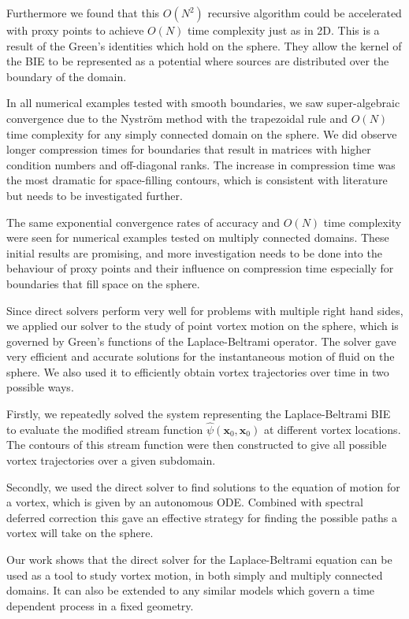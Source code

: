 \documentclass{sfuthesis}
\begin{document}
Furthermore we found that this $O(N^2)$ recursive algorithm could be accelerated with proxy points to achieve $O(N)$ time complexity just as in 2D. This is a result of the Green's identities which hold on the sphere. They allow the kernel of the BIE to be represented as a potential where sources are distributed over the boundary of the domain. 

In all numerical examples tested with smooth boundaries, we saw super-algebraic convergence due to the Nystr\"{o}m method with the trapezoidal rule and $O(N)$ time complexity for any simply connected domain on the sphere. We did observe longer compression times for boundaries that result in matrices with higher condition numbers and off-diagonal ranks. The increase in compression time was the most dramatic for space-filling contours, which is consistent with literature but needs to be investigated further. 

The same exponential convergence rates of accuracy and $O(N)$ time complexity were seen for numerical examples tested on multiply connected domains. These initial results are promising, and more investigation needs to be done into the behaviour of proxy points and their influence on compression time especially for boundaries that fill space on the sphere. 

Since direct solvers perform very well for problems with multiple right hand sides, we applied our solver to the study of point vortex motion on the sphere, which is governed by Green's functions of the Laplace-Beltrami operator. The solver gave very efficient and accurate solutions for the instantaneous motion of fluid on the sphere. We also used it to efficiently obtain vortex trajectories over time in two possible ways. 

Firstly, we repeatedly solved the system representing the Laplace-Beltrami BIE to evaluate the modified stream function $\hat{\psi}(\mathbf{x}_0, \mathbf{x}_0)$ at different vortex locations. The contours of this stream function were then constructed to give all possible vortex trajectories over a given subdomain. 

Secondly, we used the direct solver to find solutions to the equation of motion for a vortex, which is given by an autonomous ODE. Combined with spectral deferred correction this gave an effective strategy for finding the possible paths a vortex will take on the sphere. 

Our work shows that the direct solver for the Laplace-Beltrami equation can be used as a tool to study vortex motion, in both simply and multiply connected domains. It can also be extended to any similar models which govern a time dependent process in a fixed geometry. 
\end{document}
